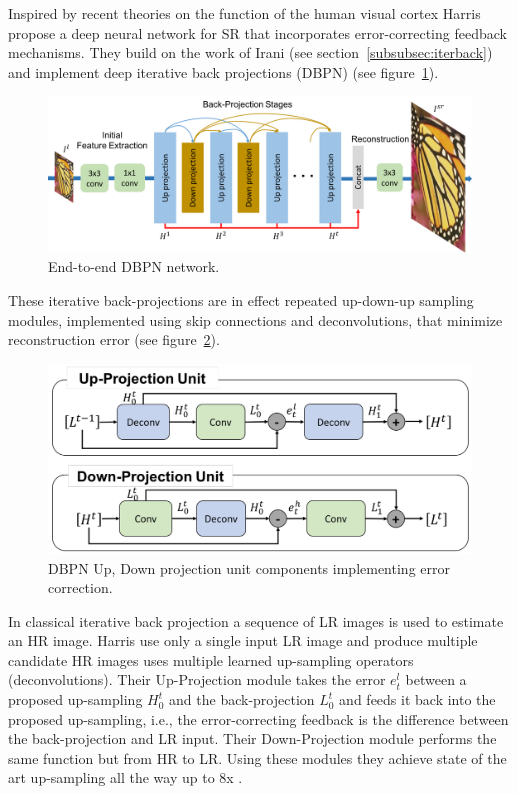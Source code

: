 Inspired by recent theories on the function of the human visual cortex \cite{kravitz2013ventral} Harris \etal \cite{haris2018deep} propose a deep neural network for SR that incorporates error-correcting feedback mechanisms.
%
They build on the work of Irani \etal (see section~\ref{subsubsec:iterback}) and implement deep iterative back projections (DBPN) (see figure~\ref{fig:dbpn}).
\begin{figure}[!htbp]
    \includegraphics[width=\textwidth,keepaspectratio]{figures/neural_networks/DBPN.png}
    \caption{End-to-end DBPN network.}\label{fig:dbpn}
\end{figure}
%
These iterative back-projections are in effect repeated up-down-up sampling modules, implemented using skip connections and deconvolutions, that minimize reconstruction error (see figure~\ref{fig:updowndbpn}).
\begin{figure}[!htbp]
    \includegraphics[width=.49\textwidth,keepaspectratio]{figures/neural_networks/up_down_up.png}
    \caption{DBPN Up, Down projection unit components implementing error correction.}\label{fig:updowndbpn}
\end{figure}
%
In classical iterative back projection a sequence of LR images is used to estimate an HR image.
%
Harris \etal use only a single input LR image and produce multiple candidate HR images uses multiple learned up-sampling operators (deconvolutions).
%
Their Up-Projection module takes the error \(e_t^l\) between a proposed up-sampling \(H_0^t\) and the back-projection \(L_0^t\) and feeds it back into the proposed up-sampling, i.e., the error-correcting feedback is the difference between the back-projection and LR input.
%
Their Down-Projection module performs the same function but from HR to LR.
%
Using these modules they achieve state of the art up-sampling all the way up to 8x \cite{timofte2018ntire}.
